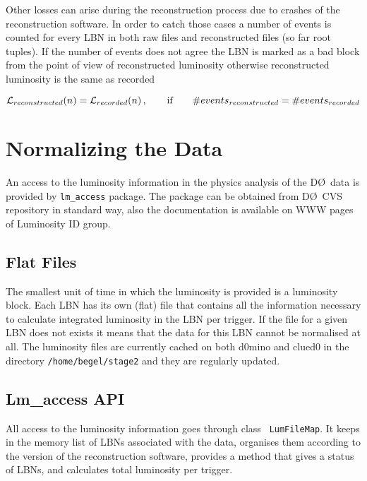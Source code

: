 \documentclass[12pt]{article}
\begin{document}
Other losses can arise during the reconstruction process due to crashes
of the reconstruction software. In order to catch those cases a number of
events is counted for every LBN in both raw files and reconstructed files
(so far root tuples). If the number of events does not agree the LBN
is marked as a bad block from the point of view of reconstructed luminosity
otherwise reconstructed luminosity is the same as recorded

\begin{equation}
{\cal L}_{reconstructed}(n) = {\cal L}_{recorded}(n)\,,\qquad 
\hbox{if}\qquad \#events_{reconstructed} = \#events_{recorded}
\label{eq:reconstructed}
\end{equation}

\section{Normalizing the Data}

An access to the luminosity information in the physics analysis of the
D\O\ data is provided by {\tt lm\_access} package. The package can be
obtained from D\O\  CVS repository in standard way, also the
documentation is available on WWW  pages of Luminosity ID group.

\subsection{Flat Files}

The smallest unit of time in which the luminosity is provided is a
luminosity block. Each LBN has its own (flat) file that contains all
the information necessary to calculate integrated luminosity in the
LBN per trigger. If the file for a given LBN does not exists it means
that the data for this LBN cannot be normalised at all. The luminosity
files are currently cached on both d0mino and clued0 in the directory
{\tt /home/begel/stage2} and they are regularly updated.

\subsection{Lm\_access API}

All access to the luminosity information goes through class {\tt
LumFileMap}.  It keeps in the memory list of LBNs associated with the
data, organises them according to the version of the reconstruction
software, provides a method that gives a status of LBNs, and
calculates total luminosity per trigger.
\end{document}

